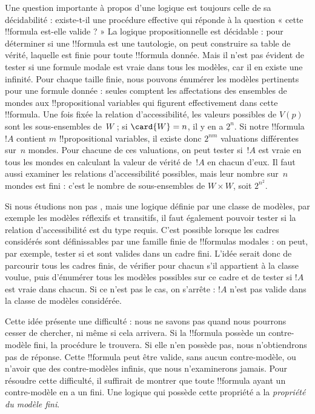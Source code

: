 \documentclass[../../../include/open-logic-section]{subfiles}
\begin{document}


Une question importante à propos d'une logique est toujours celle de
sa décidabilité : existe-t-il une procédure effective qui réponde à
la question « cette !!{formula} est-elle valide ? » La logique
propositionnelle est décidable : pour déterminer si une !!{formula}
est une tautologie, on peut construire sa table de vérité, laquelle
est finie pour toute !!{formula} donnée. Mais il n'est pas évident de
tester si une formule modale est vraie dans tous les modèles, car
il en existe une infinité. Pour chaque taille finie, nous pouvons
énumérer les modèles pertinents pour une formule donnée : seules
comptent les affectations des ensembles de mondes aux
!!{propositional variable}s qui figurent effectivement dans cette
!!{formula}. Une fois fixée la relation d'accessibilité, les valeurs
possibles de $V(p)$ sont les sous-ensembles de~$W$ ; si $\card{W} =
n$, il y en a $2^n$. Si notre !!{formula}~$!A$ contient $m$
!!{propositional variable}s, il existe donc $2^{nm}$ valuations
différentes sur~$n$ mondes. Pour chacune de ces valuations, on peut tester
si~$!A$ est vraie en tous les mondes en calculant la valeur de vérité
de~$!A$ en chacun d'eux. Il faut aussi examiner les relations d'accessibilité possibles,
mais leur nombre sur~$n$ mondes est fini : c'est le nombre de
sous-ensembles de $W \times W$, soit $2^{n^2}$.

Si nous étudions non pas , mais une logique définie par une
classe de modèles, par exemple les modèles réflexifs et transitifs,
il faut également pouvoir tester si la relation d'accessibilité est
du type requis. C'est possible lorsque les cadres considérés sont
définissables par une famille finie de !!{formula}s modales : on peut, par exemple,
tester si  et  sont valides dans un cadre fini. L'idée
serait donc de parcourir tous les cadres finis, de vérifier pour
chacun s'il appartient à la classe voulue, puis d'énumérer tous les
modèles possibles sur ce cadre et de tester si $!A$ est vraie dans
chacun. Si ce n'est pas le cas, on s'arrête : $!A$ n'est pas valide
dans la classe de modèles considérée.

Cette idée présente une difficulté : nous ne savons pas quand nous
pourrons cesser de chercher, ni même si cela arrivera. Si la
!!{formula} possède un contre-modèle fini, la procédure le trouvera.
Si elle n'en possède pas, nous n'obtiendrons pas de réponse. Cette !!{formula} peut
être valide, sans aucun contre-modèle, ou n'avoir que des
contre-modèles infinis, que nous n'examinerons jamais. Pour résoudre
cette difficulté, il suffirait de montrer que toute !!{formula} ayant
un contre-modèle en a un fini. Une logique qui possède cette propriété
a la \emph{propriété du modèle fini}.
\end{document}
